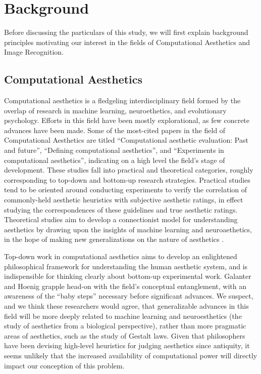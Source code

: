 \documentclass[midd]{thesis}
\begin{document}
\chapter{Background}
Before discussing the particulars of this study, we will first explain background principles motivating our interest in the fields of Computational Aesthetics and Image Recognition.

\section{Computational Aesthetics}
Computational aesthetics is a fledgeling interdisciplinary field formed by the overlap of research in machine learning, neuroethetics, and evolutionary psychology. Efforts in this field have been mostly explorational, as few concrete advances have been made. Some of the most-cited papers in the field of Computational Aesthetics are titled ``Computational aesthetic evaluation: Past and future'', ``Defining computational aesthetics'', and ``Experiments in computational aesthetics'', indicating on a high level the field's stage of development. These studies fall into practical and theoretical categories, roughly corresponding to top-down and bottom-up research strategies. Practical studies tend to be oriented around conducting experiments to verify the correlation of commonly-held aesthetic heuristics with subjective aesthetic ratings, in effect studying the correspondences of these guidelines and true aesthetic ratings. Theoretical studies aim to develop a connectionist model for understanding aesthetics by drawing upon the insights of machine learning and neuroaethetics, in the hope of making new generalizations on the nature of aesthetics \cite{galanter2012computational, hoenig2005defining, machado2008experiments}.


Top-down work in computational aesthetics aims to develop an enlightened philosophical framework for understanding the human aesthetic system, and is indispensible for thinking clearly about bottom-up experimental work. Galanter and Hoenig grapple head-on with the field's conceptual entanglement, with an awareness of the ``baby steps'' necessary before significant advances. We suspect, and we think these researchers would agree, that generalizable advances in this field will be more deeply related to machine learning and neuroesthetics (the study of aesthetics from a biological perspective), rather than more pragmatic areas of aesthetics, such as the study of Gestalt laws. Given that philosophers have been devising high-level heuristics for judging aesthetics since antiquity, it seems unlikely that the increased availability of computational power will directly impact our conception of this problem.
\end{document}
